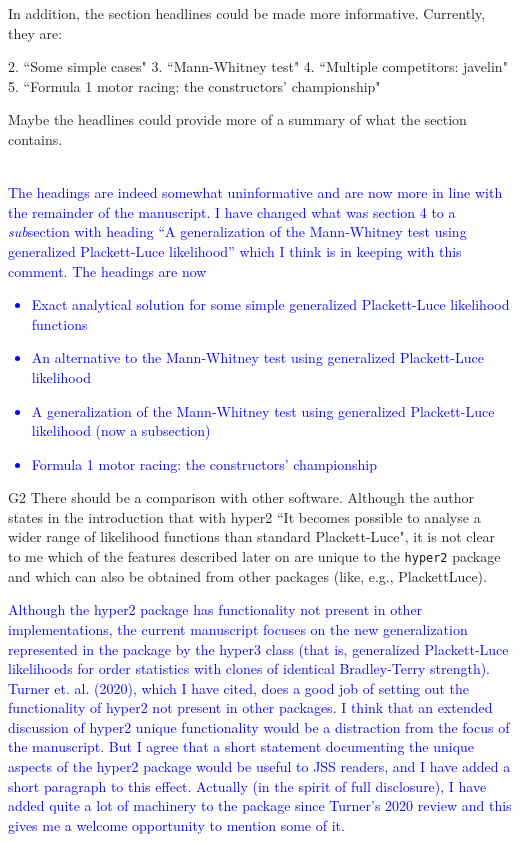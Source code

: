 \documentclass[12pt]{article}
\begin{document}
In addition, the section headlines could be made more
informative. Currently, they are:

2. ``Some simple cases"
3. ``Mann-Whitney test"
4. ``Multiple competitors: javelin"
5. ``Formula 1 motor racing: the constructors' championship"



Maybe the headlines could provide more of a summary of what the
section contains. \\ \\ \textcolor{blue}{The headings are indeed somewhat
  uninformative and are now more in line with the remainder of the
  manuscript.  I have changed what was section 4 to a {\em sub}section
  with heading ``A generalization of the Mann-Whitney test using
  generalized Plackett-Luce likelihood'' which I think is in keeping
  with this comment.  The headings are now
  \begin{itemize}
  \item Exact analytical solution for some simple generalized
    Plackett-Luce likelihood functions
  \item An alternative to the Mann-Whitney test using generalized
    Plackett-Luce likelihood
  \item A generalization of the Mann-Whitney test using
    generalized Plackett-Luce likelihood (now a subsection)
  \item Formula 1 motor racing: the constructors' championship
\end{itemize}}
\rule{0mm}{10mm}

G2 There should be a comparison with other software.  Although the
author states in the introduction that with hyper2 ``It becomes
possible to analyse a wider range of likelihood functions than
standard Plackett-Luce", it is not clear to me which of the features
described later on are unique to the \verb+hyper2+ package and which
can also be obtained from other packages (like, e.g., PlackettLuce).

\textcolor{blue}{Although the hyper2 package has functionality not
  present in other implementations, the current manuscript focuses on
  the new generalization represented in the package by the hyper3
  class (that is, generalized Plackett-Luce likelihoods for order
  statistics with clones of identical Bradley-Terry strength).  Turner
  et. al. (2020), which I have cited, does a good job of setting out
  the functionality of hyper2 not present in other packages.  I think
  that an extended discussion of hyper2 unique functionality would be
  a distraction from the focus of the manuscript.  But I agree that a
  short statement documenting the unique aspects of the hyper2 package
  would be useful to JSS readers, and I have added a short paragraph
  to this effect.  Actually (in the spirit of full disclosure), I have
  added quite a lot of machinery to the package since Turner's 2020
  review and this gives me a welcome opportunity to mention some of
  it.}
\end{document}
